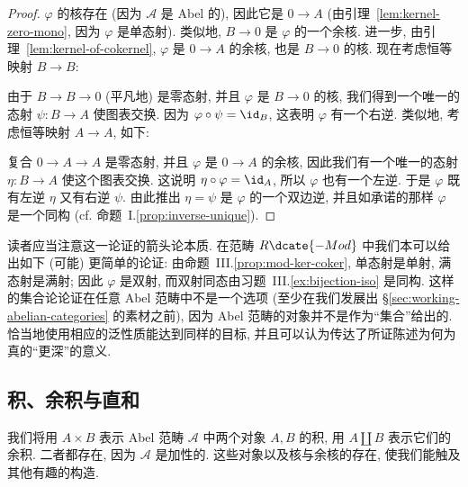 \begin{proof}
$\varphi$ 的核存在 (因为 $\mathcal{A}$ 是 Abel 的), 因此它是 $0\to A$ (由引理~\ref{lem:kernel-zero-mono}, 因为 $\varphi$ 是单态射). 类似地, $B\to 0$ 是 $\varphi$ 的一个余核. 进一步, 由引理~\ref{lem:kernel-of-cokernel}, $\varphi$ 是 $0\to A$ 的余核, 也是 $B\to 0$ 的核.
现在考虑恒等映射 $B\to B$:
\begin{center}
\end{center}
由于 $B\to B\to 0$ (平凡地) 是零态射, 并且 $\varphi$ 是 $B\to 0$ 的核, 我们得到一个唯一的态射 $\psi:B\to A$ 使图表交换. 因为 $\varphi\circ\psi=\id_B$, 这表明 $\varphi$ 有一个右逆. 类似地, 考虑恒等映射 $A\to A$, 如下:
\begin{center}
\end{center}
复合 $0\to A\to A$ 是零态射, 并且 $\varphi$ 是 $0\to A$ 的余核, 因此我们有一个唯一的态射 $\eta:B\to A$ 使这个图表交换. 这说明 $\eta\circ\varphi=\id_A$, 所以 $\varphi$ 也有一个左逆.
于是 $\varphi$ 既有左逆 $\eta$ 又有右逆 $\psi$. 由此推出 $\eta=\psi$ 是 $\varphi$ 的一个双边逆, 并且如承诺的那样 $\varphi$ 是一个同构 (cf. 命题~I.\ref{prop:inverse-unique}).
\end{proof}

\indent 读者应当注意这一论证的箭头论本质. 在范畴 $R\dcate{-Mod}$ 中我们本可以给出如下 (可能) 更简单的论证: 由命题~III.\ref{prop:mod-ker-coker}, 单态射是单射, 满态射是满射; 因此 $\varphi$ 是双射, 而双射同态由习题~III.\ref{ex:bijection-iso} 是同构. 这样的集合论论证在任意 Abel 范畴中不是一个选项 (至少在我们发展出 \S\ref{sec:working-abelian-categories} 的素材之前), 因为 Abel 范畴的对象并不是作为``集合''给出的. 恰当地使用相应的泛性质能达到同样的目标, 并且可以认为传达了所证陈述为何为真的``更深''的意义.

\subsection{积、余积与直和}
\label{subsec:products-coproducts}

我们将用 $A\times B$ 表示 Abel 范畴 $\mathcal{A}$ 中两个对象 $A,B$ 的积, 用 $A\amalg B$ 表示它们的余积. 二者都存在, 因为 $\mathcal{A}$ 是加性的.
这些对象以及核与余核的存在, 使我们能触及其他有趣的构造.

